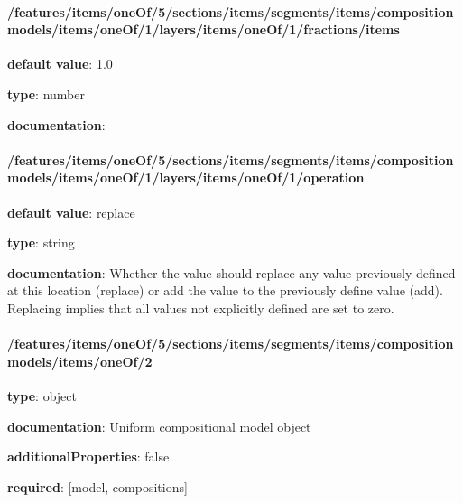 \begin{itemized}
\paragraph{/features/items/oneOf/5/sections/items/segments/items/composition models/items/oneOf/1/layers/items/oneOf/1/fractions/items} \begin{itemized}
\item {\bf default value}: 1.0
\item {\bf type}: number
\item {\bf documentation}: 
\end{itemized}\end{itemized}\paragraph{/features/items/oneOf/5/sections/items/segments/items/composition models/items/oneOf/1/layers/items/oneOf/1/operation} \begin{itemized}
\item {\bf default value}: replace
\item {\bf type}: string
\item {\bf documentation}: Whether the value should replace any value previously defined at this location (replace) or add the value to the previously define value (add). Replacing implies that all values not explicitly defined are set to zero.
\end{itemized}\paragraph{/features/items/oneOf/5/sections/items/segments/items/composition models/items/oneOf/2} \begin{itemized}
\item {\bf type}: object
\item {\bf documentation}: Uniform compositional model object
\item {\bf additionalProperties}: false
\item {\bf required}: [model, compositions]\end{itemized}
